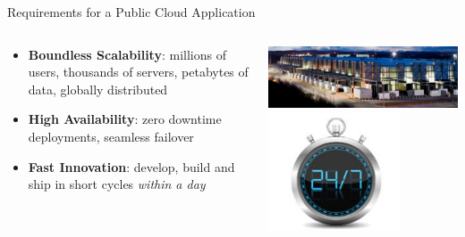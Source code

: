\begin{frame}{Requirements for a Public Cloud Application}
	\begin{columns}
	\begin{column}{.55\textwidth}
	\begin{itemize}
		\item \textbf{Boundless Scalability}: millions of users, thousands of servers, petabytes of data, globally distributed\\\vspace{9mm}
		\item \textbf{High Availability}: zero downtime deployments, seamless failover\\\vspace{9mm}
		\item \textbf{Fast Innovation}: develop, build and ship in short cycles \emph{within a day}\\\vspace{9mm}
	\end{itemize}
	\end{column}
	\begin{column}{.28\textwidth}
		\includegraphics[width=1.2\textwidth]{../MicroServiceArchitecture/images/ComputingCenter}\\
		\vspace{0.3cm}
		\includegraphics[width=0.7\textwidth]{../MicroServiceArchitecture/images/24-7}\\

\end{column}
\end{columns}
\end{frame}
